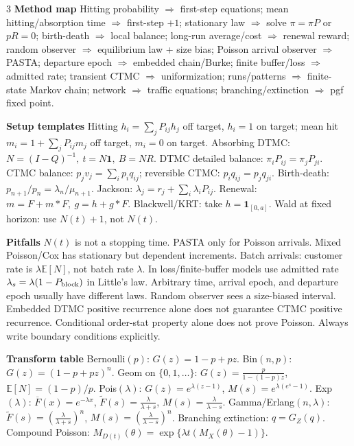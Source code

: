 \documentclass[a4paper,8pt,fleqn]{extarticle}
\newcommand{\E}{\mathbb{E}}
\newcommand{\1}{\mathbf{1}}
\newcommand{\barF}{\overline{F}}
\newcommand{\sub}[1]{\textbf{#1} }
\begin{document}
\begin{multicols}{3}
\sub{Method map} Hitting probability \(\Rightarrow\) first-step equations; mean hitting/absorption time \(\Rightarrow\) first-step \(+1\); stationary law \(\Rightarrow\) solve \(\pi=\pi P\) or \(pR=0\); birth-death \(\Rightarrow\) local balance; long-run average/cost \(\Rightarrow\) renewal reward; random observer \(\Rightarrow\) equilibrium law + size bias; Poisson arrival observer \(\Rightarrow\) PASTA; departure epoch \(\Rightarrow\) embedded chain/Burke; finite buffer/loss \(\Rightarrow\) admitted rate; transient CTMC \(\Rightarrow\) uniformization; runs/patterns \(\Rightarrow\) finite-state Markov chain; network \(\Rightarrow\) traffic equations; branching/extinction \(\Rightarrow\) pgf fixed point.

\sub{Setup templates} Hitting \(h_i=\sum_j P_{ij}h_j\) off target, \(h_i=1\) on target; mean hit \(m_i=1+\sum_jP_{ij}m_j\) off target, \(m_i=0\) on target. Absorbing DTMC: \(N=(I-Q)^{-1},\ t=N\mathbf1,\ B=NR\). DTMC detailed balance: \(\pi_iP_{ij}=\pi_jP_{ji}\). CTMC balance: \(p_jv_j=\sum_i p_iq_{ij}\); reversible CTMC: \(p_iq_{ij}=p_jq_{ji}\). Birth-death: \(p_{n+1}/p_n=\lambda_n/\mu_{n+1}\). Jackson: \(\lambda_j=r_j+\sum_i\lambda_iP_{ij}\). Renewal: \(m=F+m*F,\ g=h+g*F\). Blackwell/KRT: take \(h=\1_{[0,a]}\). Wald at fixed horizon: use \(N(t)+1\), not \(N(t)\).

\sub{Pitfalls} \(N(t)\) is not a stopping time. PASTA only for Poisson arrivals. Mixed Poisson/Cox has stationary but dependent increments. Batch arrivals: customer rate is \(\lambda\E[N]\), not batch rate \(\lambda\). In loss/finite-buffer models use admitted rate \(\lambda_s=\lambda(1-P_{\rm block})\) in Little's law. Arbitrary time, arrival epoch, and departure epoch usually have different laws. Random observer sees a size-biased interval. Embedded DTMC positive recurrence alone does not guarantee CTMC positive recurrence. Conditional order-stat property alone does not prove Poisson. Always write boundary conditions explicitly.

\sub{Transform table} Bernoulli\((p)\): \(G(z)=1-p+pz\). Bin\((n,p)\): \(G(z)=(1-p+pz)^n\). Geom on \(\{0,1,\dots\}\): \(G(z)=\frac{p}{1-(1-p)z}\), \(\E[N]=(1-p)/p\). Pois\((\lambda)\): \(G(z)=e^{\lambda(z-1)}\), \(M(s)=e^{\lambda(e^s-1)}\). Exp\((\lambda)\): \(\barF(x)=e^{-\lambda x}\), \(\tilde F(s)=\frac{\lambda}{\lambda+s}\), \(M(s)=\frac{\lambda}{\lambda-s}\). Gamma/Erlang\((n,\lambda)\): \(\tilde F(s)=\left(\frac{\lambda}{\lambda+s}\right)^n\), \(M(s)=\left(\frac{\lambda}{\lambda-s}\right)^n\). Branching extinction: \(q=G_Z(q)\). Compound Poisson: \(M_{D(t)}(\theta)=\exp\{\lambda t(M_X(\theta)-1)\}\).


\end{multicols}
\end{document}

